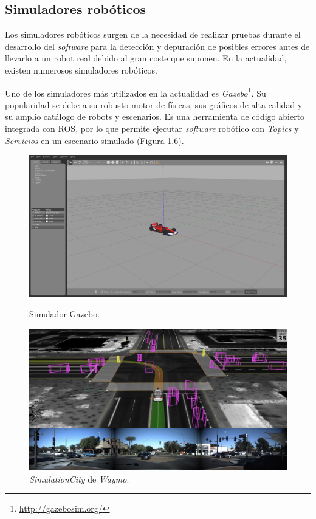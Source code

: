 \documentclass[a4paper, 12pt]{book}
\begin{document}
\subsection{Simuladores robóticos}
\label{subsec:simuladores}

Los simuladores robóticos surgen de la necesidad de realizar pruebas durante el desarrollo del \textit{software} para la detección y depuración de posibles errores antes de llevarlo a un robot real debido al gran coste que suponen. En la actualidad, existen numerosos simuladores robóticos.

Uno de los simuladores más utilizados en la actualidad es \textit{Gazebo}\footnote{\url{http://gazebosim.org/}}. Su popularidad se debe a su robusto motor de físicas, sus gráficos de alta calidad y su amplio catálogo de robots y escenarios. Es una herramienta de código abierto integrada con ROS, por lo que permite ejecutar \textit{software} robótico con \emph{Topics} y \emph{Servicios} en un escenario simulado (Figura 1.6).

\begin{figure}[H]
  \centering
  \begin{minipage}[b]{\textwidth}
  \centering
    \includegraphics[width=\textwidth]{img/gazebo}
    \caption{Simulador Gazebo.}
    \label{figura:gazebosim}
  \end{minipage}
  \hfill
  \begin{minipage}[b]{\textwidth}
  \centering
    \includegraphics[width=\textwidth]{img/waymo.jpeg}
    \caption{\emph{SimulationCity} de \emph{Waymo}.}
    \label{figura:robot_atrias}
  \end{minipage}
\end{figure}
\end{document}
